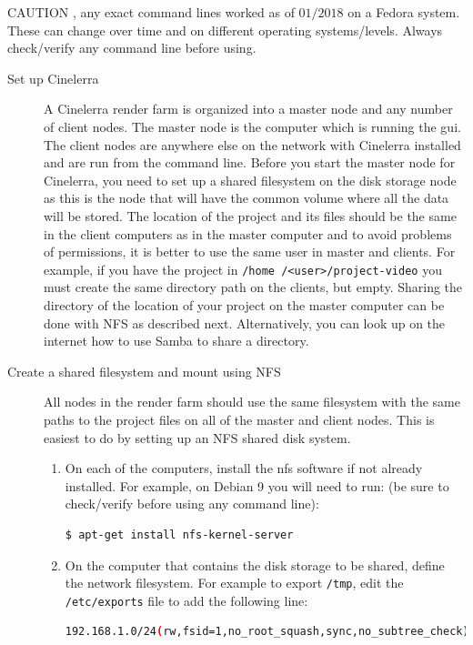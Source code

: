 {\color{red} CAUTION }, any exact command lines worked as of $01/2018$ on a Fedora system.  These can change over time and on different operating systems/levels.  Always check/verify any command line before using.

\begin{description}
    \item[Set up Cinelerra] A Cinelerra render farm is organized into a master node and any number of client nodes.  The master node is the computer which is running the gui.  The client nodes are anywhere else on the network with Cinelerra installed and are run from the command line.  Before you start the master node for Cinelerra, you need to set up a shared filesystem on the disk storage node as this is the node that will have the common volume where all the data will be stored.  
    The location of the project and its files should be the same in the client computers as in the master computer and to avoid problems of permissions, it is better to use the same user in master and clients. 
    For example, if you have the project in \texttt{/home /<user>/project-video} you must create the same directory path on the clients, but empty.  Sharing the directory of the location of your project on the master computer can be done with NFS as described next.  Alternatively, you can look up on the internet how to use Samba to share a directory.
    \item[Create a shared filesystem and mount using NFS] All nodes in the render farm should use the same filesystem with the same paths to the project files on all of the master and client nodes.  This is easiest to do by setting up an NFS shared disk system.
    \begin{enumerate}
        \item On each of the computers, install the nfs software if not already installed.  For example, on Debian 9
        you will need to run: (be sure to check/verify before using any command line):
        \begin{lstlisting}[language=bash]
$ apt-get install nfs-kernel-server
        \end{lstlisting}
        \item On the computer that contains the disk storage to be shared, define the network filesystem.  For
        example to export \texttt{/tmp}, edit the \texttt{/etc/exports} file to add the following line:
        \begin{lstlisting}[language=bash]
192.168.1.0/24(rw,fsid=1,no_root_squash,sync,no_subtree_check)
        \end{lstlisting}

\end{enumerate}
\end{description}
